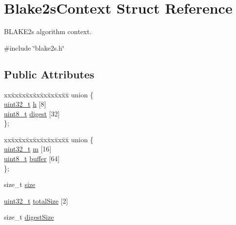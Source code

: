 \hypertarget{structBlake2sContext}{}\section{Blake2s\+Context Struct Reference}
\label{structBlake2sContext}


B\+L\+A\+K\+E2s algorithm context.  




{\ttfamily \#include \char`\"{}blake2s.\+h\char`\"{}}

\subsection*{Public Attributes}
\begin{DoxyCompactItemize}
\item 
\begin{tabbing}
xx\=xx\=xx\=xx\=xx\=xx\=xx\=xx\=xx\=\kill
union \{\\
\>\hyperlink{stdint_8h_a435d1572bf3f880d55459d9805097f62}{uint32\_t} \hyperlink{structBlake2sContext_acc8853d757da93c10c7c68a48150a5b7}{h} \mbox{[}8\mbox{]}\\
\>\hyperlink{stdint_8h_aba7bc1797add20fe3efdf37ced1182c5}{uint8\_t} \hyperlink{structBlake2sContext_add237f41dfbeda19b07ae437331e69b1}{digest} \mbox{[}32\mbox{]}\\
\}; \\

\end{tabbing}\item 
\begin{tabbing}
xx\=xx\=xx\=xx\=xx\=xx\=xx\=xx\=xx\=\kill
union \{\\
\>\hyperlink{stdint_8h_a435d1572bf3f880d55459d9805097f62}{uint32\_t} \hyperlink{structBlake2sContext_ad27d2ff046f98cc55347641763639aef}{m} \mbox{[}16\mbox{]}\\
\>\hyperlink{stdint_8h_aba7bc1797add20fe3efdf37ced1182c5}{uint8\_t} \hyperlink{structBlake2sContext_a2d534fac8f53f3181220a31a2e1257a8}{buffer} \mbox{[}64\mbox{]}\\
\}; \\

\end{tabbing}\item 
size\+\_\+t \hyperlink{structBlake2sContext_ab531fb32432b92ca49a83f04e841c0b3}{size}
\item 
\hyperlink{stdint_8h_a435d1572bf3f880d55459d9805097f62}{uint32\+\_\+t} \hyperlink{structBlake2sContext_a8db8eadcbe516527d006ef965f5f2245}{total\+Size} \mbox{[}2\mbox{]}
\item 
size\+\_\+t \hyperlink{structBlake2sContext_af889060008a4abca5aeaa642d9de3e27}{digest\+Size}
\end{DoxyCompactItemize}


